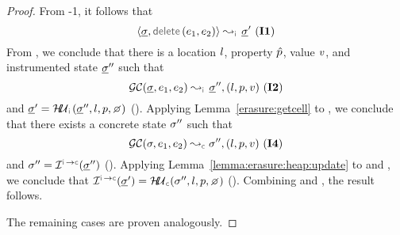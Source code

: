 \begin{proof}
\noindent {}
From \hyp{1}, it follows that 
$$\absbsemrule{\istate, \jsildelete(\jsilexpr_1, \jsilexpr_2)}{\istate'}{\instrumented} \text{ (\ieq{1})}$$
From , we conclude that there is a location $l$, property $\hat{p}$, value $v$, and instrumented state $\underline{\sigma}''$ such that 
$$\absgetcellrule{\instrumented}{\istate, \jsilexpr_1, \jsilexpr_2}{\istate'', (\loc, p, \val)} \text{ (\ieq{2})}$$ 
and 
$\istate' = \hpupdt{\instrumented}(\istate'', \loc, p, \none)$ (). 
%
Applying Lemma~\ref{erasure:getcell} to , we conclude that
there exists a concrete state $\sigma''$ such that
$$\absgetcellrule{\concrete}{\jstate, \jsilexpr_1, \jsilexpr_2}{\jstate'', (\loc, p, \val)} \text{ (\ieq{4})}$$ 
and 
$\jstate'' = \interpret{\instconc}{}(\istate'')$ (). 
%
Applying Lemma~\ref{lemma:erasure:heap:update} to  and , 
we conclude that $\interpret{\instconc}{}(\istate') = \hpupdt{\concrete}(\jstate'', \loc, p, \none)$ (). 
Combining  and , the result follows. 
\vspace{5pt} 

The remaining cases are proven analogously. 
\end{proof}


